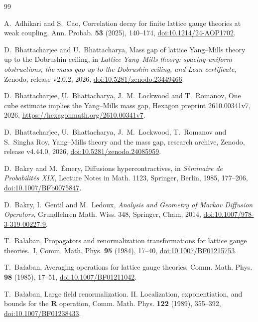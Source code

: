 \documentclass[11pt]{amsart}
\theoremstyle{definition}
\theoremstyle{remark}
\numberwithin{equation}{section}
\begin{document}
\begin{thebibliography}{99}

A.~Adhikari and S.~Cao, Correlation decay for finite lattice gauge theories at weak coupling, Ann. Probab. \textbf{53} (2025), 140--174, \href{https://doi.org/10.1214/24-AOP1702}{doi:10.1214/24-AOP1702}.

D.~Bhattacharjee and U.~Bhattacharya, Mass gap of lattice Yang--Mills theory
up to the Dobrushin ceiling, in \emph{Lattice Yang--Mills theory: spacing-uniform
obstructions, the mass gap up to the Dobrushin ceiling, and Lean certificate},
Zenodo, release v2.0.2, 2026,
\href{https://doi.org/10.5281/zenodo.23449466}{doi:10.5281/zenodo.23449466}.

D.~Bhattacharjee, U.~Bhattacharya, J.~M.~Lockwood and T.~Romanov, One cube
estimate implies the Yang--Mills mass gap, Hexagon preprint 2610.00341v7,
2026, \url{https://hexagonmath.org/2610.00341v7}.

D.~Bhattacharjee, U.~Bhattacharya, J.~M.~Lockwood, T.~Romanov and S.~Singha
Roy, Yang--Mills theory and the mass gap, research archive, Zenodo, release
v4.44.0, 2026,
\href{https://doi.org/10.5281/zenodo.24085959}{doi:10.5281/zenodo.24085959}.

D.~Bakry and M.~\'Emery, Diffusions hypercontractives, in \emph{S\'eminaire
de Probabilit\'es XIX}, Lecture Notes in Math. 1123, Springer, Berlin, 1985,
177--206, \href{https://doi.org/10.1007/BFb0075847}{doi:10.1007/BFb0075847}.

D.~Bakry, I.~Gentil and M.~Ledoux, \emph{Analysis and Geometry of Markov
Diffusion Operators}, Grundlehren Math. Wiss. 348, Springer, Cham, 2014,
\href{https://doi.org/10.1007/978-3-319-00227-9}{doi:10.1007/978-3-319-00227-9}.

T.~Ba{\l}aban, Propagators and renormalization transformations for lattice
gauge theories.~I, Comm. Math. Phys. \textbf{95} (1984), 17--40,
\href{https://doi.org/10.1007/BF01215753}{doi:10.1007/BF01215753}.

T.~Ba{\l}aban, Averaging operations for lattice gauge theories, Comm. Math.
Phys. \textbf{98} (1985), 17--51,
\href{https://doi.org/10.1007/BF01211042}{doi:10.1007/BF01211042}.

T.~Ba{\l}aban, Large field renormalization. II. Localization,
exponentiation, and bounds for the $\mathbf R$ operation, Comm. Math. Phys.
\textbf{122} (1989), 355--392,
\href{https://doi.org/10.1007/BF01238433}{doi:10.1007/BF01238433}.


\end{thebibliography}
\end{document}
